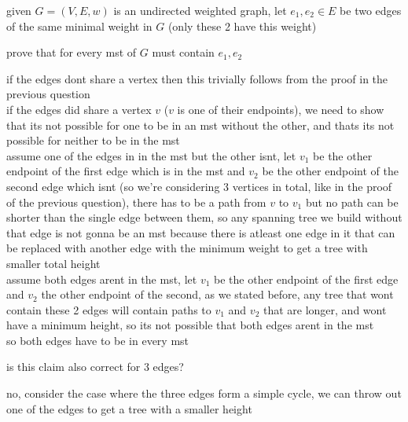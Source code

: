 \documentclass[a4paper,12pt]{article}
\begin{document}
\begin{question}
given \(G=(V,E,w)\) is an undirected weighted graph, let \(e_1,e_2 \in E\) be two edges of the same minimal weight in \(G\) (only these 2 have this weight)\\
\begin{subquestion}
prove that for every mst of \(G\) must contain \(e_1,e_2\)\\
\begin{answer}
if the edges dont share a vertex then this trivially follows from the proof in the previous question\\
if the edges did share a vertex \(v\) (\(v\) is one of their endpoints), we need to show that its not possible for one to be in an mst without the other, and thats its not possible for neither to be in the mst\\
assume one of the edges in in the mst but the other isnt, let \(v_1\) be the other endpoint of the first edge which is in the mst and \(v_2\) be the other endpoint of the second edge which isnt (so we're considering 3 vertices in total, like in the proof of the previous question), there has to be a path from \(v\) to \(v_1\) but no path can be shorter than the single edge between them, so any spanning tree we build without that edge is not gonna be an mst because there is atleast one edge in it that can be replaced with another edge with the minimum weight to get a tree with smaller total height\\
assume both edges arent in the mst, let \(v_1\) be the other endpoint of the first edge and \(v_2\) the other endpoint of the second, as we stated before, any tree that wont contain these 2 edges will contain paths to \(v_1\) and \(v_2\) that are longer, and wont have a minimum height, so its not possible that both edges arent in the mst\\
so both edges have to be in every mst\\
\end{answer}
\end{subquestion}
\begin{subquestion}
is this claim also correct for 3 edges?\\
\begin{answer}
no, consider the case where the three edges form a simple cycle, we can throw out one of the edges to get a tree with a smaller height\\
\end{answer}
\end{subquestion}
\end{question}
\end{document}
